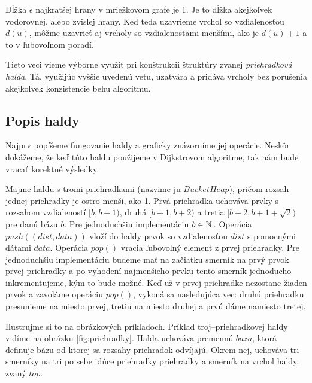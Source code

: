 \begin{example}
\label{ex:range}
Dĺžka $\epsilon$ najkratšej hrany v mriežkovom grafe je 1. Je to dĺžka akejkoľvek vodorovnej, alebo zvislej hrany.
Keď teda uzavrieme vrchol so vzdialenosťou $d(u)$, môžme uzavrieť aj vrcholy so vzdialenosťami menšími, ako je $d(u) + 1$ a to v ľubovoľnom poradí.
\end{example}

Tieto veci vieme výborne využiť pri konštrukcii štruktúry
zvanej {\sl priehradková halda}. Tá, využijúc vyššie uvedenú vetu, uzatvára a pridáva vrcholy bez porušenia akejkoľvek konzistencie behu algoritmu.

\subsection{Popis haldy}
Najprv popíšeme fungovanie haldy a graficky znázorníme jej 
operácie. Neskôr dokážeme, že keď túto haldu použijeme v Dijkstrovom algoritme, tak nám bude vracať korektné výsledky.

Majme haldu s tromi priehradkami (nazvime ju $BucketHeap$), pričom rozsah jednej priehradky je ostro menší, ako 1.
Prvá priehradka uchováva prvky s rozsahom vzdialeností $ [b, b+1) $, druhá $ [b+1, b+2) $ a tretia $ [b+2, b+1+\sqrt{2}) $
pre danú bázu $ b $. Pre jednoduchšiu implementáciu $b \in \mathbb{N}\,$. Operácia $push((dist, data))$ vloží do haldy prvok so vzdialenosťou $dist$ 
s pomocnými dátami $data$. Operácia $pop()$ vracia ľubovoľný element z prvej priehradky. 
Pre jednoduchšiu implementáciu budeme mať na začiatku smerník na prvý prvok prvej priehradky a po vyhodení najmenšieho prvku tento smerník jednoducho inkrementujeme, kým to bude možné. Keď už v prvej priehradke nezostane žiaden prvok a zavoláme operáciu $pop()$, vykoná sa nasledujúca vec: druhú priehradku presunieme na miesto prvej, tretiu na miesto druhej a prvú dáme namiesto tretej.

Ilustrujme si to na obrázkových príkladoch. Príklad troj--priehradkovej haldy vidíme na obrázku \ref{fig:priehradky}.
Halda uchováva premennú $ baza $, ktorá definuje bázu od ktorej sa rozsahy priehradok odvíjajú. Okrem
nej, uchováva tri smerníky na tri po sebe idúce priehradky priehradky a smerník na vrchol haldy, zvaný $ top $.



